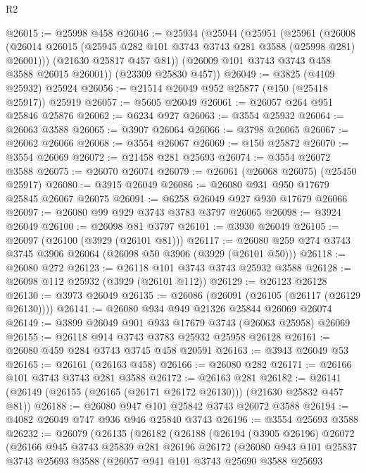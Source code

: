 \begin{lexlean}{R2}
\begin{coremodule}
@26015 := @25998 @458
@26046 := @25934
    (@25944
      (@25951
        (@25961
          (@26008 (@26014 @26015 (@25945 @282 @101 @3743 @3743 @281 @3588 (@25998 @281) @26001)))
          (@21630 @25817 @457 @81))
        (@26009 @101 @3743 @3743 @458 @3588 @26015 @26001))
      (@23309 @25830 @457))
@26049 := @3825 (@4109 @25932) @25924
@26056 := @21514 @26049 @952 @25877 (@150 (@25418 @25917)) @25919
@26057 := @5605 @26049
@26061 := @26057 @264 @951 @25846 @25876
@26062 := @6234 @927
@26063 := @3554 @25932
@26064 := @26063 @3588
@26065 := @3907 @26064
@26066 := @3798 @26065
@26067 := @26062 @26066
@26068 := @3554 @26067
@26069 := @150 @25872
@26070 := @3554 @26069
@26072 := @21458 @281 @25693
@26074 := @3554 @26072 @3588
@26075 := @26070 @26074
@26079 := @26061 (@26068 @26075) (@25450 @25917)
@26080 := @3915 @26049
@26086 := @26080 @931 @950 @17679 @25845 @26067 @26075
@26091 := @6258 @26049 @927 @930 @17679 @26066
@26097 := @26080 @99 @929 @3743 @3783 @3797 @26065
@26098 := @3924 @26049
@26100 := @26098 @81 @3797
@26101 := @3930 @26049
@26105 := @26097 (@26100 (@3929 (@26101 @81)))
@26117 := @26080 @259 @274 @3743 @3745 @3906 @26064 (@26098 @50 @3906 (@3929 (@26101 @50)))
@26118 := @26080 @272
@26123 := @26118 @101 @3743 @3743 @25932 @3588
@26128 := @26098 @112 @25932 (@3929 (@26101 @112))
@26129 := @26123 @26128
@26130 := @3973 @26049
@26135 := @26086 (@26091 (@26105 (@26117 (@26129 @26130))))
@26141 := @26080 @934 @949 @21326 @25844 @26069 @26074
@26149 := @3899 @26049 @901 @933 @17679 @3743 (@26063 @25958) @26069
@26155 := @26118 @914 @3743 @3783 @25932 @25958 @26128
@26161 := @26080 @459 @284 @3743 @3745 @458 @20591
@26163 := @3943 @26049 @53
@26165 := @26161 (@26163 @458)
@26166 := @26080 @282
@26171 := @26166 @101 @3743 @3743 @281 @3588
@26172 := @26163 @281
@26182 := @26141 (@26149 (@26155 (@26165 (@26171 @26172 @26130))) (@21630 @25832 @457 @81))
@26188 := @26080 @947 @101 @25842 @3743 @26072 @3588
@26194 := @4082 @26049 @747 @936 @946 @25840 @3743
@26196 := @3554 @25693 @3588
@26232 := @26079
    (@26135
      (@26182
        (@26188
          (@26194
            (@3905 @26196)
            @26072
            (@26166
              @945
              @3743
              @25839
              @281
              @26196
              @26172
              (@26080
                @943
                @101
                @25837
                @3743
                @25693
                @3588
                (@26057
                  @941
                  @101
                  @3743
                  @25690
                  @3588
                  @25693

\end{coremodule}
\end{lexlean}
